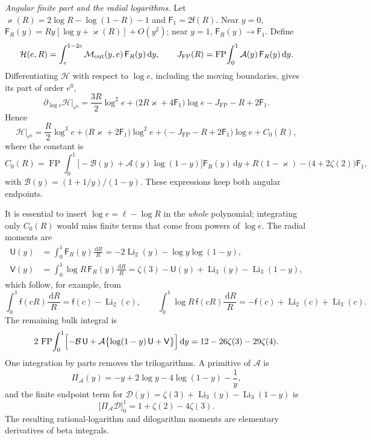 \documentclass[11pt,a4paper]{article}
\numberwithin{equation}{section}
\newcommand{\dd}{\,\mathrm d}
\newcommand{\FP}{\operatorname{FP}}
\newcommand{\Li}{\operatorname{Li}}
\begin{document}
\emph{Angular finite part and the radial logarithms.} Let $\varkappa(R)=2\log R-\log(1-R)-1$ and
$\mathsf F_1=2\mathsf f(R)$. Near $y=0$, $\mathsf F_R(y)=Ry[\log y+\varkappa(R)]+O(y^2)$; near $y=1$,
$\mathsf F_R(y)\to\mathsf F_1$. Define
\begin{equation}
 \mathcal H(e,R)=\int_e^{1-2e}\mathcal M_{\rm out}(y,e)\,\mathsf F_R(y)\dd y,\qquad
 J_{\FP}(R)=\FP\!\int_0^1\mathcal A(y)\,\mathsf F_R(y)\dd y.
\end{equation}
Differentiating $\mathcal H$ with respect to $\log e$, including the moving boundaries, gives its part of order $e^0$,
\begin{equation}
 \partial_{\log e}\mathcal H\big|_{e^0}=\frac{3R}{2}\log^2e+\bigl(2R\varkappa+4\mathsf F_1\bigr)\log e-J_{\FP}-R
 +2\mathsf F_1.
\end{equation}
Hence
\begin{equation}
 \mathcal H\big|_{e^0}=\frac R2\log^3e+\bigl(R\varkappa+2\mathsf F_1\bigr)\log^2e+\bigl(-J_{\FP}-R+2\mathsf F_1\bigr)\log e
 +C_0(R),
\end{equation}
where the constant is
\begin{equation}
 C_0(R)=\FP\!\int_0^1\bigl[-\mathcal B(y)+\mathcal A(y)\log(1-y)\bigr]\mathsf F_R(y)\dd y+R(1-\varkappa)
 -\bigl(4+2\zeta(2)\bigr)\mathsf F_1,
\end{equation}
with $\mathcal B(y)=(1+1/y)/(1-y)$. These expressions keep both angular endpoints.

It is essential to insert $\log e=\ell-\log R$ in the \emph{whole} polynomial; integrating only $C_0(R)$ would miss
finite terms that come from powers of $\log e$. The radial moments are
\begin{equation}
\begin{aligned}
 \mathsf U(y)&=\int_0^1\mathsf F_R(y)\frac{\dd R}{R}=-2\Li_2(y)-\log y\log(1-y),\\
 \mathsf V(y)&=\int_0^1\log R\,\mathsf F_R(y)\frac{\dd R}{R}=\zeta(3)-\mathsf U(y)+\Li_3(y)-\Li_3(1-y),
\end{aligned}
\end{equation}
which follow, for example, from
\begin{equation}
 \int_0^1\mathsf f(cR)\frac{\dd R}{R}=\mathsf f(c)-\Li_2(c),\qquad
 \int_0^1\log R\,\mathsf f(cR)\frac{\dd R}{R}=-\mathsf f(c)+\Li_2(c)+\Li_3(c).
\end{equation}
The remaining bulk integral is
\begin{equation}
 2\,\FP\!\int_0^1\Bigl[-\mathcal B\,\mathsf U+\mathcal A\bigl\{\log(1-y)\,\mathsf U+\mathsf V\bigr\}\Bigr]\dd y
 =12-26\zeta(3)-29\zeta(4).
 \label{eq:dualB:ep4bulk}
\end{equation}
One integration by parts removes the trilogarithms. A primitive of $\mathcal A$ is
\begin{equation}
 \Pi_{\mathcal A}(y)=-y+2\log y-4\log(1-y)-\frac1y,
\end{equation}
and the finite endpoint term for $\mathcal D(y)=\zeta(3)+\Li_3(y)-\Li_3(1-y)$ is
\begin{equation}
 \bigl[\Pi_{\mathcal A}\mathcal D\bigr]_0^1=1+\zeta(2)-4\zeta(3).
\end{equation}
The resulting rational-logarithm and dilogarithm moments are elementary derivatives of beta integrals.
\end{document}
